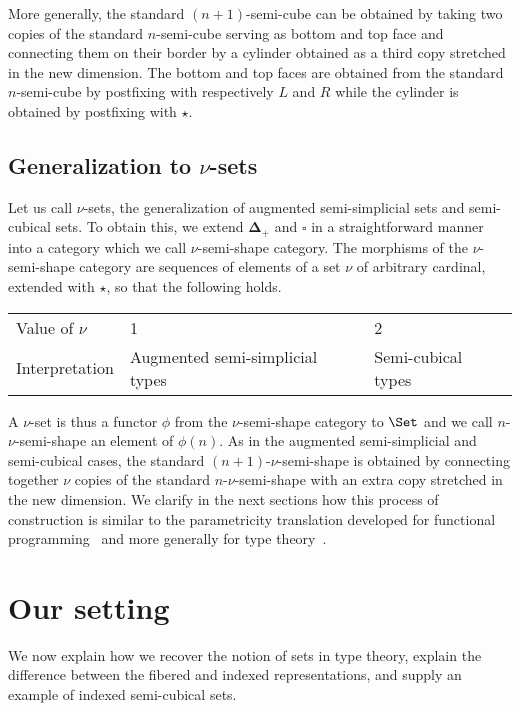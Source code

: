 \documentclass[10pt]{art.cls/art}
\newcommand{\DeltaPlus}{\ensuremath{\boldsymbol{\Delta}_+}}
\newcommand{\Cube}{\ensuremath{\boldsymbol{\square}}}
\newcommand{\kstar}{{\star}}
\def\graymidrule{\arrayrulecolor{gray30}\midrule\arrayrulecolor{gray65}}
\begin{document}
More generally, the standard $(n + 1)$-semi-cube can be obtained by taking two copies of the standard $n$-semi-cube serving as bottom and top face and connecting them on their border by a cylinder obtained as a third copy stretched in the new dimension. The bottom and top faces are obtained from the standard $n$-semi-cube by postfixing with respectively $L$ and $R$ while the cylinder is obtained by postfixing with $\kstar$.

\subsection{Generalization to \texorpdfstring{$\nu$}{ν}-sets}
Let us call $\nu$-sets, the generalization of augmented semi-simplicial sets and semi-cubical sets. To obtain this, we extend $\DeltaPlus$ and $\Cube$ in a straightforward manner into a category which we call $\nu$-semi-shape category. The morphisms of the $\nu$-semi-shape category are sequences of elements of a set $\nu$ of arbitrary cardinal, extended with $\kstar$, so that the following holds.

\begin{table}[H]
  \centering
  \begin{tabularx}{0.95\linewidth}{X|X|X}
    \toprule
    Value of $\nu$ & 1                               & 2                  \\
    \graymidrule
    Interpretation & Augmented semi-simplicial types & Semi-cubical types \\
    \bottomrule
  \end{tabularx}
\end{table}

A $\nu$-set is thus a functor $\phi$ from the $\nu$-semi-shape category to $\Set$ and we call $n$-$\nu$-semi-shape an element of $\phi(n)$. As in the augmented semi-simplicial and semi-cubical cases, the standard $(n + 1)$-$\nu$-semi-shape is obtained by connecting together $\nu$ copies of the standard $n$-$\nu$-semi-shape with an extra copy stretched in the new dimension. We clarify in the next sections how this process of construction is similar to the parametricity translation developed for functional programming~\cite{reynolds72} and more generally for type theory~\cite{bernardy10, bernardy11, atkey14, bernardy15}.

\section{Our setting}
We now explain how we recover the notion of sets in type theory, explain the difference between the fibered and indexed representations, and supply an example of indexed semi-cubical sets.
\end{document}
